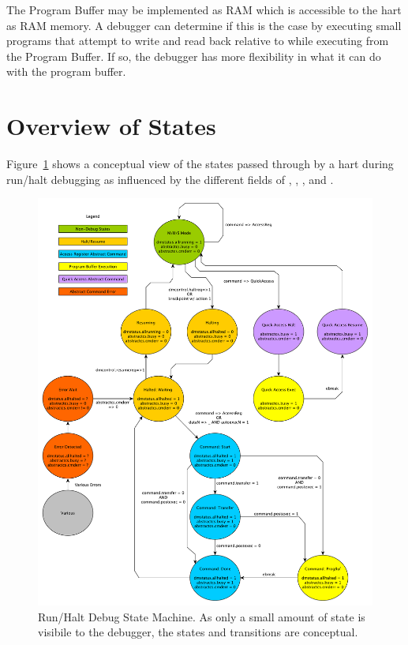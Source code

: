 The Program Buffer may be implemented as RAM which is accessible to the
hart as RAM memory. A debugger can determine if this is the case by executing small
programs that attempt to write and read back relative to \Rpc while executing
from the Program Buffer.
If so, the debugger has more flexibility in what it can do with the program buffer.

\section{Overview of States}

Figure~\ref{fig:abstract_sm} shows a conceptual view of the states
passed through by a hart during run/halt debugging as influenced
by the different fields of \Rdmcontrol, \Rabstractcs, \Rabstractauto, and
\Rcommand.

\begin{figure}
   \centering
   \includegraphics[width=\textwidth]{fig/abstract_commands.pdf}
   \caption[Run/Halt Debug State Machine]{Run/Halt Debug State Machine.
     As only a small amount of state is visibile to the debugger,
     the states and transitions are conceptual.}
   \label{fig:abstract_sm}
\end{figure}


